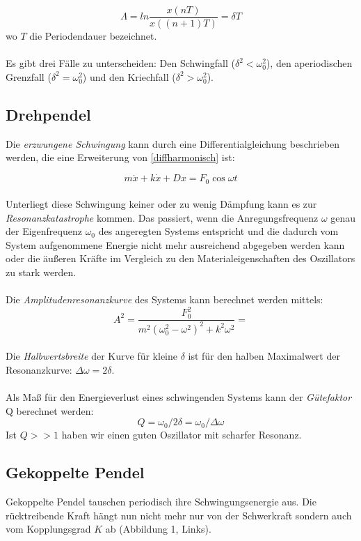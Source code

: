 \documentclass{article}
\begin{document}
\begin{equation}
\label{dekrement}
\Lambda=ln\frac{x(nT)}{x((n+1)T)}=\delta T
\end{equation}
wo $T$ die Periodendauer bezeichnet.\\
\\
Es gibt drei Fälle zu unterscheiden: Den Schwingfall ($\delta^2 < \omega^2_0$), den aperiodischen Grenzfall ($\delta^2 = \omega^2_0$) und den Kriechfall ($\delta^2 > \omega^2_0$).

\subsection{Drehpendel}

Die \textit{erzwungene Schwingung} kann durch eine Differentialgleichung beschrieben werden, die eine Erweiterung von \ref{diffharmonisch} ist:

\begin{equation}
\label{erzwungen}
m\ddot{x}+k\dot{x}+Dx=F_0\cos\omega t
\end{equation}
\\
Unterliegt diese Schwingung keiner oder zu wenig Dämpfung kann es zur \textit{Resonanzkatastrophe} kommen. Das passiert, wenn die Anregungsfrequenz $\omega$ genau der Eigenfrequenz $\omega_0$ des angeregten Systems entspricht und die dadurch vom System aufgenommene Energie nicht mehr ausreichend abgegeben werden kann oder die äußeren Kräfte im Vergleich zu den Materialeigenschaften des Oszillators zu stark werden.\\
\\
Die \textit{Amplitudenresonanzkurve} des Systems kann berechnet werden mittels:
\begin{equation}
\label{amplreskurve}
A^2=\frac{F_0^2}{m^2(\omega_0^2-\omega^2)^2+k^2\omega^2}=
\end{equation}
\\
Die \textit{Halbwertsbreite} der Kurve für kleine $\delta$ ist für den halben Maximalwert der Resonanzkurve: $\Delta \omega=2\delta$.\\
\\
Als Maß für den Energieverlust eines schwingenden Systems kann der \textit{Gütefaktor} Q berechnet werden:
\begin{equation}
\label{faktorq}
Q=\omega_0/2\delta=\omega_0/\Delta \omega
\end{equation}
Ist $Q>>1$ haben wir einen guten Oszillator mit scharfer Resonanz.

\subsection{Gekoppelte Pendel}
Gekoppelte Pendel tauschen periodisch ihre Schwingungsenergie aus. Die rücktreibende Kraft hängt nun nicht mehr nur von der Schwerkraft sondern auch vom Kopplungsgrad $K$ ab (Abbildung 1, Links).
\end{document}
